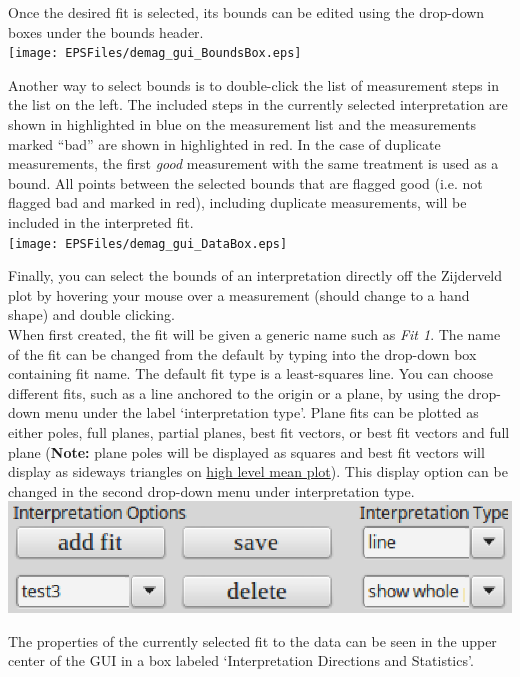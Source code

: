 \documentclass[11pt]{book}
\begin{document}
{{\noindent Once the desired fit is selected, its bounds can be edited using the drop-down boxes under the bounds header.\\

\texttt{[image: EPSFiles/demag\_gui\_BoundsBox.eps]}

\noindent Another way to select bounds is to double-click the list of measurement steps in the list on the left. The included steps in the currently selected interpretation are shown in highlighted in blue on the measurement list and the measurements marked ``bad'' are shown in highlighted in red. In the case of duplicate measurements, the first \emph{good} measurement with the same treatment is used as a bound. All points between the selected bounds that are flagged good (i.e. not flagged bad and marked in red), including duplicate measurements, will be included in the interpreted fit.\\

\texttt{[image: EPSFiles/demag\_gui\_DataBox.eps]}

\noindent Finally, you can select the bounds of an interpretation directly off the Zijderveld plot by hovering your mouse over a measurement (should change to a hand shape) and double clicking.\\

\noindent When first created, the fit will be given a generic name such as
\emph{Fit 1}. The name of the fit can be changed from the default by typing into the drop-down box containing fit name. The default fit type is a least-squares line. You can choose different fits, such as a line anchored to the origin or a plane, by using the drop-down menu under the label `interpretation type'. Plane fits can be plotted as either poles, full planes, partial planes, best fit vectors, or best fit vectors and full plane ({\bf Note:} plane poles will be displayed as squares and best fit vectors will display as sideways triangles on \hyperref[higher-level-plots-and-interpretation]{high level mean plot}). This display option can be changed in the second drop-down menu under interpretation type.\\

\includegraphics[width=10 cm]{EPSFiles/demag_gui_SpecimenMeanType.eps}

\noindent The properties of the currently selected fit to the data can be seen in the upper center of the GUI in a box labeled `Interpretation Directions and Statistics'.\\

}}
\end{document}
